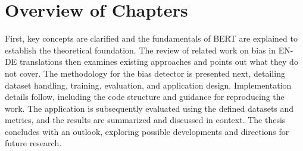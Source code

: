 \section{Overview of Chapters}
    First, key concepts are clarified and the fundamentals of BERT are explained to establish the theoretical foundation. The review of related work on bias in EN-DE translations then examines existing approaches and points out what they do not cover. The methodology for the bias detector is presented next, detailing dataset handling, training, evaluation, and application design. Implementation details follow, including the code structure and guidance for reproducing the work. The application is subsequently evaluated using the defined datasets and metrics, and the results are summarized and discussed in context. The thesis concludes with an outlook, exploring possible developments and directions for future research.